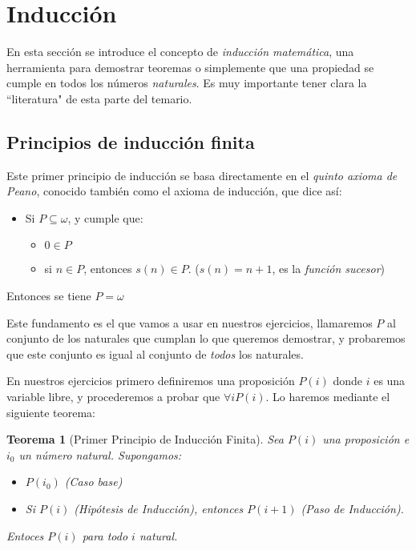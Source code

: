 \documentclass[a4paper]{article}
\title {\fbox{\Huge{\textbf{Resumen de lógica}}}}
\author {\fbox{Mapachana}}
\theoremstyle{plain} \newtheorem{PrimerPrincipio}{Teorema}
\theoremstyle{plain} \newtheorem{SegundoPrincipio}{Teorema}
\begin{document}
\maketitle


\section{Inducción}

En esta sección se introduce el concepto de \emph{inducción matemática}, una herramienta para demostrar teoremas o simplemente que una propiedad se cumple en todos los números \emph{naturales}. Es muy importante tener clara la ``literatura" de esta parte del temario.

\subsection{Principios de inducción finita}

Este primer principio de inducción se basa directamente en el \emph{quinto axioma de Peano}, conocido también como el axioma de inducción, que dice así:

\begin{itemize}
				\item Si $P\subseteq\omega$, y cumple que:
								\begin{itemize}
												\item $0 \in P$
												\item si $n \in P$, entonces $s(n) \in P$. ($s(n)=n+1$, es la \emph{función sucesor})
								\end{itemize}
\end{itemize}
Entonces se tiene $P = \omega$

Este fundamento es el que vamos a usar en nuestros ejercicios, llamaremos $P$ al conjunto de los naturales que cumplan lo que queremos demostrar, y probaremos que este conjunto es igual al conjunto de \emph{todos} los naturales.

En nuestros ejercicios primero definiremos una proposición $P(i)$ donde $i$ es una variable libre, y procederemos a probar que $\forall i P(i)$. Lo haremos mediante el siguiente teorema:

\begin{PrimerPrincipio}[Primer Principio de Inducción Finita]
				Sea $P(i)$ una proposición e $i_0$ un número natural. Supongamos:
				\begin{itemize}
								\item $P(i_0)$ (Caso base)
								\item Si $P(i)$ (Hipótesis de Inducción), entonces $P(i+1)$ (Paso de Inducción).
				\end{itemize}
				Entoces $P(i)$ para todo $i$ natural.
\end{PrimerPrincipio}
\end{document}
